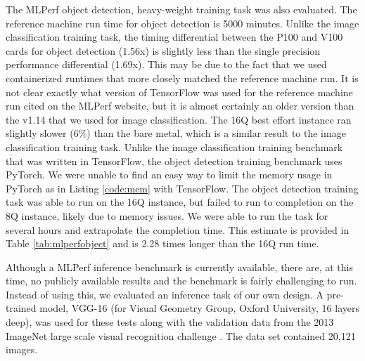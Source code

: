 \documentclass[acmsmall, authorversion]{acmart}
\begin{document}
\begin{table}[t]
\centering
\caption{MLperf 0.5 Image Classification Training Run Times}
\label{tab:mlperfimage}

\end{table}

The MLPerf object detection, heavy-weight training task was also evaluated. The reference machine run time for object detection is 5000 minutes. Unlike the image classification training task, the timing differential between the P100 and V100 cards for object detection (1.56x) is slightly less than the single precision performance differential (1.69x). This may be due to the fact that we used containerized runtimes that more closely matched the reference machine run. It is not clear exactly what version of TensorFlow was used for the reference machine run cited on the MLPerf website, but it is almost certainly an older version than the v1.14 that we used for image classification. The 16Q best effort instance ran slightly slower (6\%) than the bare metal, which is a similar result to the image classification training task. Unlike the image classification training benchmark that was written in TensorFlow, the object detection training benchmark uses PyTorch. We were unable to find an easy way to limit the memory usage in PyTorch as in Listing \ref{code:mem} with TensorFlow. The object detection training task was able to run on the 16Q instance, but failed to run to completion on the 8Q instance, likely due to memory issues. We were able to run the task for several hours and extrapolate the completion time. This estimate is provided in Table \ref{tab:mlperfobject} and is 2.28 times longer than the 16Q run time.

Although a MLPerf inference benchmark is currently available, there are, at this time, no publicly available results and the benchmark is fairly challenging to run. Instead of using this, we evaluated an inference task of our own design. A pre-trained model, VGG-16 (for Visual Geometry Group, Oxford University, 16 layers deep), \cite{classify-vgg} was used for these tests along with the validation data from the 2013 ImageNet large scale visual recognition challenge \cite{classify-data}. The data set contained 20,121 images.
\end{document}
